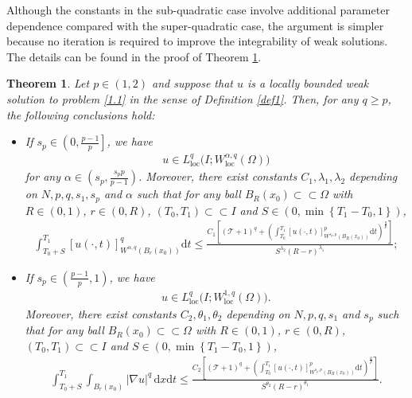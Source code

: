 \documentclass[reqno,10pt]{amsart}
\numberwithin{equation}{section}
\newtheorem{theorem}{Theorem}[section]
\begin{document}
Although the constants in the sub-quadratic case involve additional parameter dependence compared with the super-quadratic case, the argument is simpler because no iteration is required to improve the integrability of weak solutions. The details can be found in the proof of Theorem \ref{th21}.

\begin{theorem}
	\label{th21}
	Let $p\in(1,2)$ and suppose that $u$ is a locally bounded weak solution to problem \eqref{1.1} in the sense of Definition \ref{def1}. Then, for any $q\ge p$, the following conclusions hold:
	\begin{itemize}
		\item[(i)] If $s_p\in \left( 0,\frac{p-1}{p}\right]$, we have
		\begin{align*}
			u\in L^q_{\mathrm{loc}}\bigl(I;W^{\alpha,q}_{\mathrm{loc}}(\Omega)\bigl)
		\end{align*}
		for any $\alpha\in\left(s_p,\frac{s_pp}{p-1}\right)$. Moreover, there exist constants $C_1,\lambda_1,\lambda_2$ depending on $N,p,q,s_1,s_p$ and $\alpha$ such that for any ball $B_R(x_0)\subset\subset\Omega$ with $R\in(0,1)$, $r\in (0,R)$, $(T_0,T_1)\subset\subset I$ and $S\in \left( 0,\min\left\lbrace T_1-T_0,1\right\rbrace \right) $,
		\begin{align*}
			\int_{T_0+S}^{T_1}[u(\cdot,t)]^q_{W^{\alpha,q}\left( B_r(x_0)\right) }\mathrm{d}t\le\frac{C_1\left[\left(\mathcal{T}+1\right)^q+\left( \int_{T_0}^{T_1}[u(\cdot,t)]^p_{W^{s_p,p}\left( B_R(x_0)\right)}\mathrm{d}t\right)^{\frac{q}{p}} \right]}{S^{\lambda_2}(R-r)^{\lambda_1}};
		\end{align*}
		\item[(ii)] If $s_p\in \left( \frac{p-1}{p},1\right)$, we have
		\begin{align*}
			u\in L^q_{\mathrm{loc}}\bigl(I;W^{1,q}_{\mathrm{loc}}(\Omega)\bigl).
		\end{align*}
		Moreover, there exist constants $C_2, \theta_1, \theta_2$ depending on $N, p, q, s_1$ and $s_p$ such that for any ball $B_R(x_0)\subset\subset\Omega$ with $R\in(0,1)$, $r\in (0,R)$, $(T_0,T_1)\subset\subset I$ and $S\in \left( 0,\min\left\lbrace T_1-T_0,1\right\rbrace \right) $,
		\begin{align*}
			\int_{T_0+S}^{T_1}\int_{B_r(x_0)}|\nabla u|^q\,\mathrm{d}x\mathrm{d}t\le\frac{C_2\left[\left(\mathcal{T}+1\right)^q+\left( \int_{T_0}^{T_1}[u(\cdot,t)]^p_{W^{s_p,p}\left( B_R(x_0)\right)}\mathrm{d}t\right)^{\frac{q}{p}} \right]}{S^{\theta_2}(R-r)^{\theta_1}}.
		\end{align*}
	\end{itemize}
\end{theorem}
\end{document}
